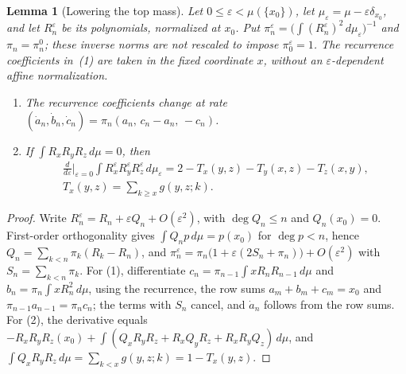 \documentclass[twoside,10pt]{article}
\numberwithin{equation}{section}
\theoremstyle{slbody}
\newtheorem{lemma}[theorem]{Lemma}
\theoremstyle{definition}
\theoremstyle{remark}
\begin{document}
\begin{lemma}[Lowering the top mass]\label{lem:topmass}
Let $0\leq\varepsilon<\mu(\{x_0\})$, let $\mu_\varepsilon=\mu-\varepsilon\delta_{x_0}$, and let $R_n^\varepsilon$ be its polynomials, normalized at $x_0$. Put $\pi_n^\varepsilon=\bigl(\int(R_n^\varepsilon)^2\,d\mu_\varepsilon\bigr)^{-1}$ and $\pi_n=\pi_n^0$; these inverse norms are not rescaled to impose $\pi_0^\varepsilon=1$. The recurrence coefficients in~(1) are taken in the fixed coordinate $x$, without an $\varepsilon$-dependent affine normalization.
\begin{enumerate}
\item The recurrence coefficients change at rate $(\dot a_n,\dot b_n,\dot c_n)=\pi_n(a_n,\,c_n-a_n,\,-c_n)$.
\item If $\int R_xR_yR_z\,d\mu=0$, then
\begin{gather*}
\frac{d}{d\varepsilon}\Big|_{\varepsilon=0}\int R^\varepsilon_xR^\varepsilon_yR^\varepsilon_z\,d\mu_\varepsilon=2-T_x(y,z)-T_y(x,z)-T_z(x,y),\\
T_x(y,z)=\sum_{k\geq x}g(y,z;k).
\end{gather*}
\end{enumerate}
\end{lemma}
\begin{proof}
Write $R_n^\varepsilon=R_n+\varepsilon Q_n+O(\varepsilon^2)$, with $\deg Q_n\leq n$ and $Q_n(x_0)=0$. First-order orthogonality gives $\int Q_np\,d\mu=p(x_0)$ for $\deg p<n$, hence $Q_n=\sum_{k<n}\pi_k(R_k-R_n)$, and $\pi_n^\varepsilon=\pi_n\bigl(1+\varepsilon(2S_n+\pi_n)\bigr)+O(\varepsilon^2)$ with $S_n=\sum_{k<n}\pi_k$. For (1), differentiate $c_n=\pi_{n-1}\int xR_nR_{n-1}\,d\mu$ and $b_n=\pi_n\int xR_n^2\,d\mu$, using the recurrence, the row sums $a_m+b_m+c_m=x_0$ and $\pi_{n-1}a_{n-1}=\pi_nc_n$; the terms with $S_n$ cancel, and $\dot a_n$ follows from the row sums. For (2), the derivative equals $-R_xR_yR_z(x_0)+\int(Q_xR_yR_z+R_xQ_yR_z+R_xR_yQ_z)\,d\mu$, and $\int Q_xR_yR_z\,d\mu=\sum_{k<x}g(y,z;k)=1-T_x(y,z)$.
\end{proof}
\end{document}
